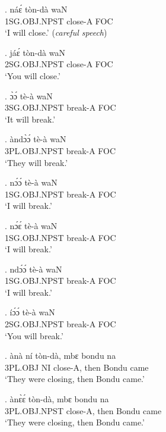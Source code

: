 \documentclass{assets/fieldnotes}
\begin{document}
\exg.
náɛ́            tòn-dà    waN \\
1SG.OBJ.NPST   close-A   FOC \\%
`I will close.' (\textit{careful speech})

\exg.
jáɛ́            tòn-dà    waN \\
2SG.OBJ.NPST   close-A   FOC \\%
`You will close.'

\exg.
ɔ̀ɔ́             tè-à      waN \\
3SG.OBJ.NPST   break-A   FOC \\%
`It will break.'

\exg.
àndɔ̀ɔ́          tè-à      waN \\
3PL.OBJ.NPST   break-A   FOC \\%
`They will break.'

\exg.
nɔ́ɔ́            tè-à      waN \\
1SG.OBJ.NPST   break-A   FOC \\%
`I will break.'

\exg.
nɔ́ɛ́            tè-à      waN \\
1SG.OBJ.NPST   break-A   FOC \\%
`I will break.' \label{53108}


\exg.
ndɔ́ɔ́           tè-à      waN \\
1SG.OBJ.NPST   break-A   FOC \\%
`I will break.' \label{39569}


\exg.
íɔ́ɔ́            tè-à      waN \\
2SG.OBJ.NPST   break-A   FOC \\%
`You will break.'

\exg.
ànà       ní   tòn-dà,    mbɛ    bondu   na   \\
3PL.OBJ   NI   close-A,   then   Bondu   came \\%
`They were closing, then Bondu came.'

\exg.
ànɛ̀ɛ́           tòn-dà,    mbɛ    bondu   na   \\
3PL.OBJ.NPST   close-A,   then   Bondu   came \\%
`They were closing, then Bondu came.'
\end{document}
